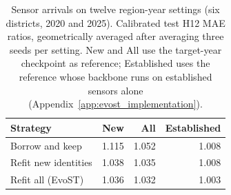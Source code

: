 \begin{table}[t]
\centering
\caption{Sensor arrivals on twelve region-year settings (six districts, 2020 and 2025). Calibrated test H12 MAE ratios, geometrically averaged after averaging three seeds per setting. New and All use the target-year checkpoint as reference; Established uses the reference whose backbone runs on established sensors alone (Appendix~\ref{app:evost_implementation}).}
\label{tab:arrival}
\begin{tabular}{lrrr}
\toprule
Strategy & New & All & Established \\
\midrule
Borrow and keep & 1.115 & 1.052 & 1.008 \\
Refit new identities & 1.038 & 1.035 & 1.008 \\
Refit all (EvoST) & 1.036 & 1.032 & 1.003 \\
\bottomrule
\end{tabular}
\end{table}

